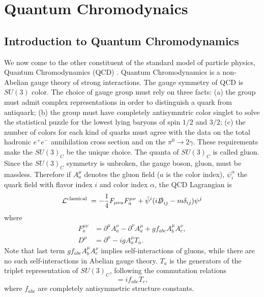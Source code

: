 \chapter{Quantum Chromodynaics}
\section{Introduction to Quantum Chromodynamics}

We now come to the other constituent of the standard model of particle physics, Quantum Chromodynamics (QCD) \cite{Pol,Pol1,GrossWil, GrossWil1, SWQCD, SWQCD1}. Quantum Chromodynamics is a non-Abelian gauge theory of strong interactions. The gauge symmetry of QCD is $SU(3)$ color. The choice of gauge group must rely on three facts: (a) the group must admit complex representations in order to distinguish a quark from antiquark; (b) the group must have completely antisymmtric color singlet to solve the statistical puzzle for the lowest lying baryons of spin $1/2$ and $3/2$; (c) the number of colors for each kind of quarks must agree with the data on the total hadronic $e^+e^-$ annihilation cross section and on the $\pi^0\to2\gamma$. These requirements make the $SU(3)_C$ be the unique choice. The quanta of $SU(3)_C$ is called gluon. Since the $SU(3)_C$ symmetry is unbroken, the gauge boson, gluon, must be massless. Therefore if $A_a^\mu$ denotes the gluon field ($a$ is the color index), $\psi^\alpha_i$ the quark field with flavor index $i$ and color index $\alpha$, the QCD Lagrangian is 
\begin{equation}
\mathcal{L}^\text{classical }=-\frac{1}{4}F_{\mu\nu a}F^{\mu\nu}_a+\bar{\psi}^i( i\slashed D_{ij}-m\delta_{ij}){\psi}^j 
\end{equation}
where
\begin{align}
F^{\mu\nu}_a&=\partial^\mu A^\nu_a-\partial^\nu A^\mu_a+gf_{abc} A^\mu_b A^\nu_c,\\
D^\mu&=\partial^\mu-igA^\mu_aT_{a}.
\end{align} 
Note that last term $gf_{abc}A^\mu_bA^\nu_c$ implies self-interactions of gluons, while there are no such self-interactions in Abelian gauge theory. $T_a$ is the generators of the triplet representation of $SU(3)_C$, following the commutation relations 
\begin{equation}
[T_a, T_b]=if_{abc}T_c,
\end{equation}
where $f_{abc}$ are completely antisymmetric structure constants.  

